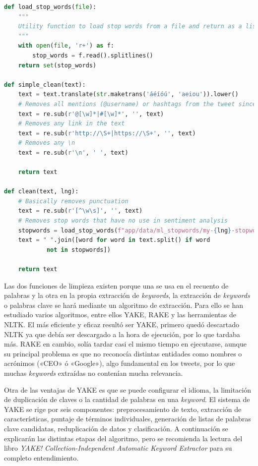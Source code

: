 \begin{lstlisting}[caption=Limpieza de las publicaciones implementada,          label={lst:listing-python},language=Python]
def load_stop_words(file): 
    """
    Utility function to load stop words from a file and return as a list of words
    """
    with open(file, 'r+') as f:
        stop_words = f.read().splitlines()
    return set(stop_words)

def simple_clean(text):
    text = text.translate(str.maketrans('áéíóú', 'aeiou')).lower()
    # Removes all mentions (@username) or hashtags from the tweet since it is of no use to us
    text = re.sub(r'@[\w]*|#[\w]*', '', text)
    # Removes any link in the text
    text = re.sub(r'http://\S+|https://\S+', '', text)
    # Removes any \n
    text = re.sub(r'\n', ' ', text)

    return text

def clean(text, lng):
    # Basically removes punctuation
    text = re.sub(r'[^\w\s]', '', text)
    # Removes stop words that have no use in sentiment analysis
    stopwords = load_stop_words(f"app/data/ml_stopwords/my-{lng}-stopwords.txt")
    text = " ".join([word for word in text.split() if word
            not in stopwords])

    return text
\end{lstlisting}

Las dos funciones de limpieza existen porque una se usa en el recuento de palabras y la otra en la propia extracción de \textit{keywords}, la extracción de \textit{keywords} o palabras clave se hará mediante un algoritmo de extracción. Para ello se han estudiado varios algoritmos, entre ellos \ac{YAKE}, \ac{RAKE} y las herramientas de \ac{NLTK}. El más eficiente y eficaz resultó ser \ac{YAKE}, primero quedó descartado \ac{NLTK} ya que debía ser descargado a la hora de ejecución, por lo que tardaba más. \ac{RAKE} en cambio, solía tardar casi el mismo tiempo en ejecutarse, aunque su principal problema es que no reconocía distintas entidades como nombres o acrónimos («CEO» ó «Google»), algo fundamental en los tweets, por lo que muchas \textit{keywords} extraídas no contenían mucha relevancia.

\vspace{0.3cm}

Otra de las ventajas de \ac{YAKE} es que se puede configurar el idioma, la limitación de duplicación de claves o la cantidad de palabras en una \textit{keyword}. El sistema de \ac{YAKE} se rige por seis componentes: preprocesamiento de texto, extracción de características, puntaje de términos individuales, generación de listas de palabras clave candidatas, reduplicación de datos y clasificación. A continuación se explicarán las distintas etapas del algoritmo, pero se recomienda la lectura del libro \textit{YAKE! Collection-Independent Automatic Keyword Extractor} para su completo entendimiento. \cite{yake-libro}

